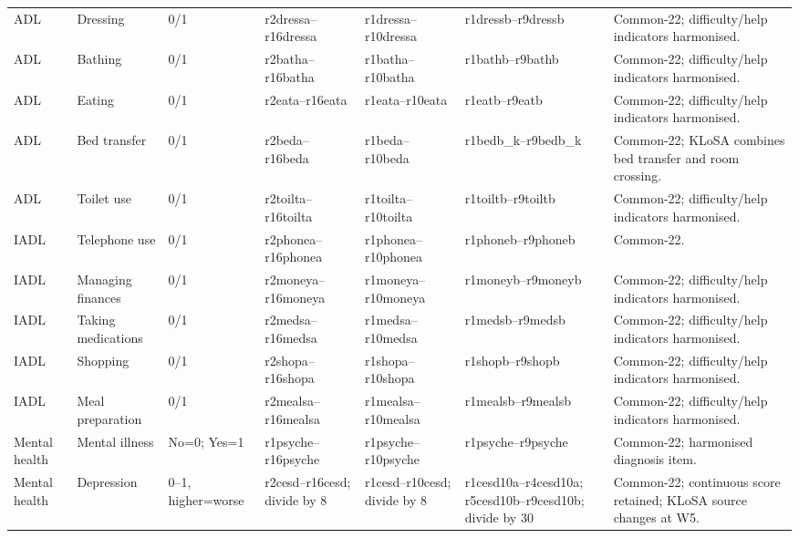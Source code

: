 \begin{landscape}
\begin{longtable}{@{}L{2.50cm}L{2.90cm}L{3.20cm}L{2.90cm}L{2.90cm}L{3.00cm}L{6.80cm}@{}}
ADL & Dressing & 0/1 & r2dressa--r16dressa & r1dressa--r10dressa & r1dressb--r9dressb & Common-22; difficulty/help indicators harmonised. \\
ADL & Bathing & 0/1 & r2batha--r16batha & r1batha--r10batha & r1bathb--r9bathb & Common-22; difficulty/help indicators harmonised. \\
ADL & Eating & 0/1 & r2eata--r16eata & r1eata--r10eata & r1eatb--r9eatb & Common-22; difficulty/help indicators harmonised. \\
ADL & Bed transfer & 0/1 & r2beda--r16beda & r1beda--r10beda & r1bedb\_k--r9bedb\_k & Common-22; KLoSA combines bed transfer and room crossing. \\
ADL & Toilet use & 0/1 & r2toilta--r16toilta & r1toilta--r10toilta & r1toiltb--r9toiltb & Common-22; difficulty/help indicators harmonised. \\

IADL & Telephone use & 0/1 & r2phonea--r16phonea & r1phonea--r10phonea & r1phoneb--r9phoneb & Common-22. \\
IADL & Managing finances & 0/1 & r2moneya--r16moneya & r1moneya--r10moneya & r1moneyb--r9moneyb & Common-22; difficulty/help indicators harmonised. \\
IADL & Taking medications & 0/1 & r2medsa--r16medsa & r1medsa--r10medsa & r1medsb--r9medsb & Common-22; difficulty/help indicators harmonised. \\
IADL & Shopping & 0/1 & r2shopa--r16shopa & r1shopa--r10shopa & r1shopb--r9shopb & Common-22; difficulty/help indicators harmonised. \\
IADL & Meal preparation & 0/1 & r2mealsa--r16mealsa & r1mealsa--r10mealsa & r1mealsb--r9mealsb & Common-22; difficulty/help indicators harmonised. \\

Mental health & Mental illness & No=0; Yes=1 & r1psyche--r16psyche & r1psyche--r10psyche & r1psyche--r9psyche & Common-22; harmonised diagnosis item. \\
Mental health & Depression & 0--1, higher=worse & r2cesd--r16cesd; divide by 8 & r1cesd--r10cesd; divide by 8 & r1cesd10a--r4cesd10a; r5cesd10b--r9cesd10b; divide by 30 & Common-22; continuous score retained; KLoSA source changes at W5. \\


\end{longtable}
\end{landscape}
